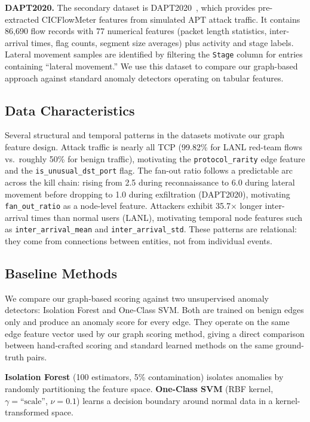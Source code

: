 \documentclass[letterpaper,twocolumn,10pt]{article}
\begin{document}
\textbf{DAPT2020.}
The secondary dataset is DAPT2020~\cite{dapt2020}, which provides pre-extracted CICFlowMeter features from simulated APT attack traffic. It contains 86,690 flow records with 77 numerical features (packet length statistics, inter-arrival times, flag counts, segment size averages) plus activity and stage labels. Lateral movement samples are identified by filtering the \texttt{Stage} column for entries containing ``lateral movement.'' We use this dataset to compare our graph-based approach against standard anomaly detectors operating on tabular features.

\subsection{Data Characteristics}

Several structural and temporal patterns in the datasets motivate our graph feature design. Attack traffic is nearly all TCP (99.82\% for LANL red-team flows vs.\ roughly 50\% for benign traffic), motivating the \texttt{protocol\_rarity} edge feature and the \texttt{is\_unusual\_dst\_port} flag. The fan-out ratio follows a predictable arc across the kill chain: rising from 2.5 during reconnaissance to 6.0 during lateral movement before dropping to 1.0 during exfiltration (DAPT2020), motivating \texttt{fan\_out\_ratio} as a node-level feature. Attackers exhibit 35.7$\times$ longer inter-arrival times than normal users (LANL), motivating temporal node features such as \texttt{inter\_arrival\_mean} and \texttt{inter\_arrival\_std}. These patterns are relational: they come from connections between entities, not from individual events.

\subsection{Baseline Methods}

We compare our graph-based scoring against two unsupervised anomaly detectors: Isolation Forest and One-Class SVM. Both are trained on benign edges only and produce an anomaly score for every edge. They operate on the same edge feature vector used by our graph scoring method, giving a direct comparison between hand-crafted scoring and standard learned methods on the same ground-truth pairs.

\textbf{Isolation Forest} (100 estimators, 5\% contamination) isolates anomalies by randomly partitioning the feature space. \textbf{One-Class SVM} (RBF kernel, $\gamma{=}\text{``scale''}$, $\nu{=}0.1$) learns a decision boundary around normal data in a kernel-transformed space.
\end{document}
